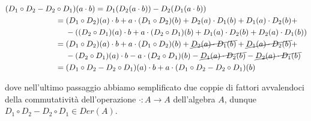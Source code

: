 \begin{align}
	\begin{split}
		(D_{1} \circ D_{2} - D_{2} &\circ D_{1})(a \cdot b) = D_{1}(D_{2}(a \cdot b)) - D_{2}(D_{1}(a \cdot b))\\
		&= (D_{1} \circ D_{2})(a) \cdot b + a \cdot (D_{1} \circ D_{2})(b) + D_{2}(a) \cdot D_{1}(b) + D_{1}(a) \cdot D_{2}(b) +\\
		& \hspace{13px} - ((D_{2} \circ D_{1})(a) \cdot b + a \cdot (D_{2} \circ D_{1})(b) + D_{1}(a) \cdot D_{2}(b) + D_{2}(a) \cdot D_{1}(b))\\
		&= (D_{1} \circ D_{2})(a) \cdot b + a \cdot (D_{1} \circ D_{2})(b) + \cancel{ D_{2}(a) \cdot D_{1}(b) } + \cancel{ D_{1}(a) \cdot D_{2}(b) } +\\
		& \hspace{13px} - (D_{2} \circ D_{1})(a) \cdot b - a \cdot (D_{2} \circ D_{1})(b) - \cancel{ D_{1}(a) \cdot D_{2}(b) } - \cancel{ D_{2}(a) \cdot D_{1}(b) }\\
		&= (D_{1} \circ D_{2} - D_{2} \circ D_{1})(a) \cdot b + a \cdot (D_{1} \circ D_{2} - D_{2} \circ D_{1})(b)
	\end{split}
\end{align}

dove nell'ultimo passaggio abbiamo semplificato due coppie di fattori avvalendoci della commutatività dell'operazione $ \cdot : A \to A $ dell'algebra $ A $, dunque $ D_{1} \circ D_{2} - D_{2} \circ D_{1} \in Der(A) $.

